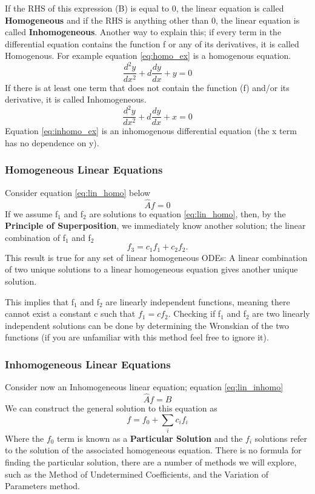 \documentclass{article}
\newcommand{\be}{\begin{equation}}
\newcommand{\ee}{\end{equation}}
\begin{document}
If the RHS of this expression (B) is equal to 0, the linear equation is called \textbf{Homogeneous} and if the RHS is anything other than 0, the linear equation is called \textbf{Inhomogeneous}.
Another way to explain this; if every term in the differential equation contains the function f or any of its derivatives, it is called Homogenous.
For example equation \ref{eq:homo_ex} is a homogenous equation.
\be \label{eq:homo_ex}
\frac{d^2y}{dx^2} + d\frac{dy}{dx} + y = 0
\ee
If there is at least one term that does not contain the function (f) and/or its derivative, it is called Inhomogeneous.
\be \label{eq:inhomo_ex}
\frac{d^2y}{dx^2} + d\frac{dy}{dx} + x = 0
\ee
Equation \ref{eq:inhomo_ex} is an inhomogenous differential equation (the x term has no dependence on y).

\subsubsection*{Homogeneous Linear Equations}
Consider equation \ref{eq:lin_homo} below
\be \label{eq:lin_homo}
\hat{A}f = 0
\ee
If we assume f$_1$ and f$_2$ are solutions to equation \ref{eq:lin_homo}, then, by the \textbf{Principle of Superposition}, we immediately know another solution; the linear combination of f$_1$ and f$_2$
\be
f_3 = c_1f_1 + c_2f_2 .
\ee
This result is true for any set of linear homogeneous ODEs: A linear combination of two unique solutions to a linear homogeneous equation gives another unique solution.

This implies that f$_1$ and f$_2$ are linearly independent functions, meaning there cannot exist a constant c such that $f_1 = cf_2$.
Checking if f$_1$ and f$_2$ are two linearly independent solutions can be done by determining the Wronskian of the two functions (if you are unfamiliar with this method feel free to ignore it).

\subsubsection*{Inhomogeneous Linear Equations}
Consider now an Inhomogeneous linear equation; equation \ref{eq:lin_inhomo}
\be \label{eq:lin_inhomo}
\hat{A}f = B
\ee
We can construct the general solution to this equation as
\be
f = f_0 + \sum_i c_i f_i
\ee
Where the $f_0$ term is known as a \textbf{Particular Solution} and the $f_i$ solutions refer to the solution of the associated homogeneous equation.
There is no formula for finding the particular solution, there are a number of methods we will explore, such as the Method of Undetermined Coefficients, and the Variation of Parameters method.
\end{document}
